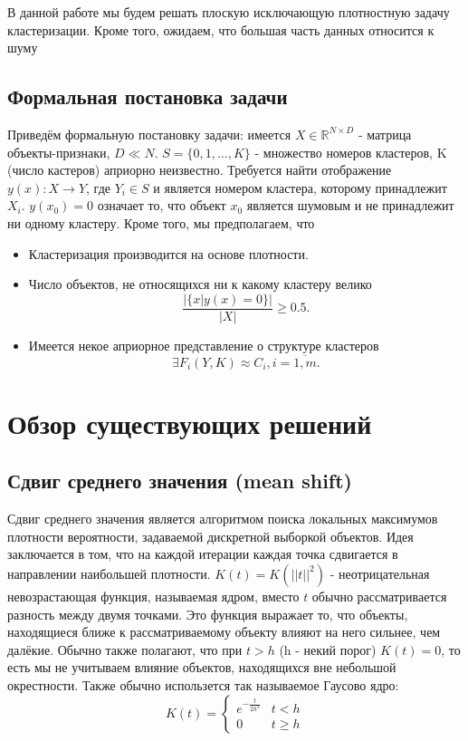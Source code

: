 \documentclass[12pt,fleqn]{article}
\begin{document}
В данной работе мы будем решать плоскую исключающую плотностную задачу кластеризации. Кроме того, ожидаем, что большая часть данных относится к шуму

\subsection{Формальная постановка задачи}
Приведём формальную постановку задачи: имеется $X \in \mathbb {R}^{N \times D}$ -  матрица объекты-признаки, $D \ll N$. $S = \{0, 1, ..., K \}$ - множество номеров кластеров, K (число кастеров) априорно неизвестно. Требуется найти отображение $y(x): X \rightarrow Y$, где $Y_i \in S$ и является номером кластера, которому принадлежит $X_i$.
 $y(x_0) = 0$ означает то, что объект $x_0$ является шумовым и не принадлежит ни одному кластеру. Кроме того, мы предполагаем, что
\begin{itemize}
\item Кластеризация производится на основе плотности.

\item Число объектов, не относящихся ни к какому кластеру велико
\begin{equation}\label{more_noize}
         \frac{|\{x|y(x)=0\}|}{|X|} \geqslant 0.5.
      \end{equation}

\item Имеется некое априорное представление о структуре кластеров
\begin{equation}\label{features}
         \exists  F_i(Y, K) \approx C_i, i = \overline{1, m}.
      \end{equation}
\end{itemize}

\section{Обзор существующих решений}

\subsection{Сдвиг среднего значения (mean shift)}
Сдвиг среднего значения является алгоритмом поиска локальных максимумов плотности вероятности, задаваемой дискретной выборкой объектов. Идея заключается в том, что на каждой итерации каждая точка сдвигается в направлении наибольшей плотности. 
$K(t) = K(||t||^2)$ - неотрицательная невозрастающая функция, называемая ядром, вместо $t$ обычно рассматривается разность между двумя точками. Это функция выражает то, что объекты, находящиеся ближе к рассматриваемому объекту влияют на него сильнее, чем далёкие.
Обычно также полагают, что при $t > h$ (h - некий порог) $K(t)=0$, то есть мы не учитываем влияние объектов, находящихся вне небольшой окрестности. Также обычно использется так называемое Гаусово ядро:
\begin{equation*}
K(t) =
 \begin{cases}
   e^{-\frac{t}{2h^2}} &  t < h\\
   0 & t \geq h
 \end{cases}
\end{equation*}
\end{document}
